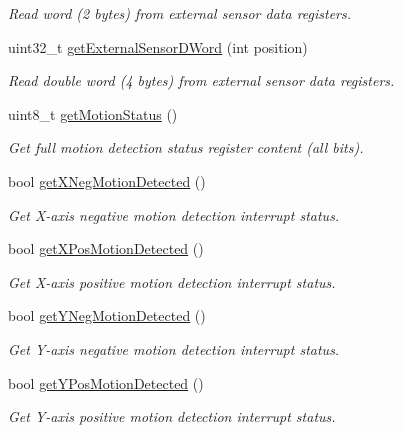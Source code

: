 \begin{DoxyCompactItemize}
\begin{DoxyCompactList}\small\item\em Read word (2 bytes) from external sensor data registers. \end{DoxyCompactList}\item 
uint32\+\_\+t \mbox{\hyperlink{classMPU6050_afd8983f0911e37015434bebc85185fb2}{get\+External\+Sensor\+D\+Word}} (int position)
\begin{DoxyCompactList}\small\item\em Read double word (4 bytes) from external sensor data registers. \end{DoxyCompactList}\item 
uint8\+\_\+t \mbox{\hyperlink{classMPU6050_af6e4fd231a9db99bd4270cf640eeae46}{get\+Motion\+Status}} ()
\begin{DoxyCompactList}\small\item\em Get full motion detection status register content (all bits). \end{DoxyCompactList}\item 
bool \mbox{\hyperlink{classMPU6050_a446d235905783c5b90637a6b6792ac76}{get\+X\+Neg\+Motion\+Detected}} ()
\begin{DoxyCompactList}\small\item\em Get X-\/axis negative motion detection interrupt status. \end{DoxyCompactList}\item 
bool \mbox{\hyperlink{classMPU6050_a410af58f5ff5f74e4ef8d61495908226}{get\+X\+Pos\+Motion\+Detected}} ()
\begin{DoxyCompactList}\small\item\em Get X-\/axis positive motion detection interrupt status. \end{DoxyCompactList}\item 
bool \mbox{\hyperlink{classMPU6050_a6c45be7b4aa9081c83ee0f4081bf0827}{get\+Y\+Neg\+Motion\+Detected}} ()
\begin{DoxyCompactList}\small\item\em Get Y-\/axis negative motion detection interrupt status. \end{DoxyCompactList}\item 
bool \mbox{\hyperlink{classMPU6050_ad959ec84b9fe9f7e416b7af252f37abc}{get\+Y\+Pos\+Motion\+Detected}} ()
\begin{DoxyCompactList}\small\item\em Get Y-\/axis positive motion detection interrupt status. \end{DoxyCompactList}\item 

\end{DoxyCompactItemize}
